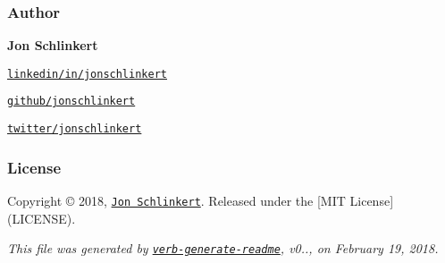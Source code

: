 \subsubsection*{Author}

{\bfseries Jon Schlinkert}


\begin{DoxyItemize}
\item \href{https://linkedin.com/in/jonschlinkert}{\tt linkedin/in/jonschlinkert}
\item \href{https://github.com/jonschlinkert}{\tt github/jonschlinkert}
\item \href{https://twitter.com/jonschlinkert}{\tt twitter/jonschlinkert}
\end{DoxyItemize}

\subsubsection*{License}

Copyright © 2018, \href{https://github.com/jonschlinkert}{\tt Jon Schlinkert}. Released under the \mbox{[}M\+IT License\mbox{]}(L\+I\+C\+E\+N\+SE).





{\itshape This file was generated by \href{https://github.com/verbose/verb-generate-readme}{\tt verb-\/generate-\/readme}, v0.., on February 19, 2018.} 
